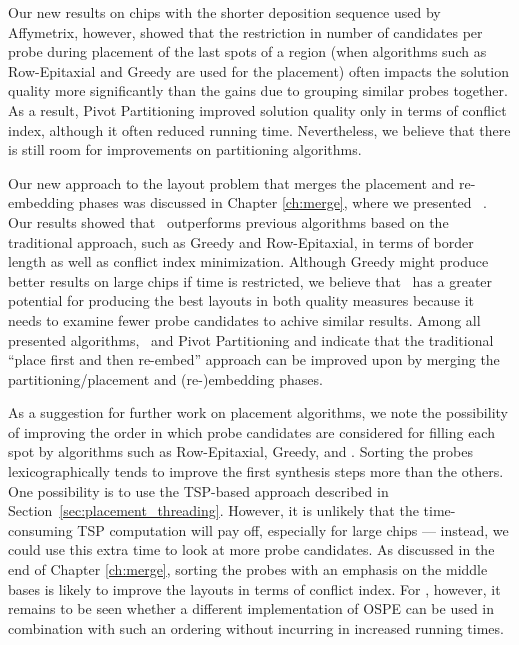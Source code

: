 Our new results on chips with the shorter deposition sequence used by
Affymetrix, however, showed that the restriction in number of candidates per
probe during placement of the last spots of a region (when algorithms such as
Row-Epitaxial and Greedy are used for the placement) often impacts the solution
quality more significantly than the gains due to grouping similar probes
together. As a result, Pivot Partitioning improved solution quality only in
terms of conflict index, although it often reduced running time. Nevertheless,
we believe that there is still room for improvements on partitioning algorithms.

Our new approach to the layout problem that merges the placement and
re-embedding phases was discussed in Chapter \ref{ch:merge}, where we presented
\Greedyplus\ \citep{Carvalho2007}. Our results showed that \Greedyplus\
outperforms previous algorithms based on the traditional approach, such as
Greedy and Row-Epitaxial, in terms of border length as well as conflict index
minimization. Although Greedy might produce better results on large chips if
time is restricted, we believe that \Greedyplus\ has a greater potential for
producing the best layouts in both quality measures because it needs to examine
fewer probe candidates to achive similar results. Among all presented
algorithms, \Greedyplus\ and Pivot Partitioning and indicate that the
traditional ``place first and then re-embed'' approach can be improved upon by
merging the partitioning/placement and (re-)embedding phases.

As a suggestion for further work on placement algorithms, we note the
possibility of improving the order in which probe candidates are considered for
filling each spot by algorithms such as Row-Epitaxial, Greedy, and \Greedyplus.
Sorting the probes lexicographically tends to improve the first synthesis steps
more than the others. One possibility is to use the TSP-based approach described
in Section~\ref{sec:placement_threading}. However, it is unlikely that the
time-consuming TSP computation will pay off, especially for large chips ---
instead, we could use this extra time to look at more probe candidates. As
discussed in the end of Chapter \ref{ch:merge}, sorting the probes with an
emphasis on the middle bases is likely to improve the layouts in terms of
conflict index. For \Greedyplus, however, it remains to be seen whether a
different implementation of OSPE can be used in combination with such an
ordering without incurring in increased running times.

